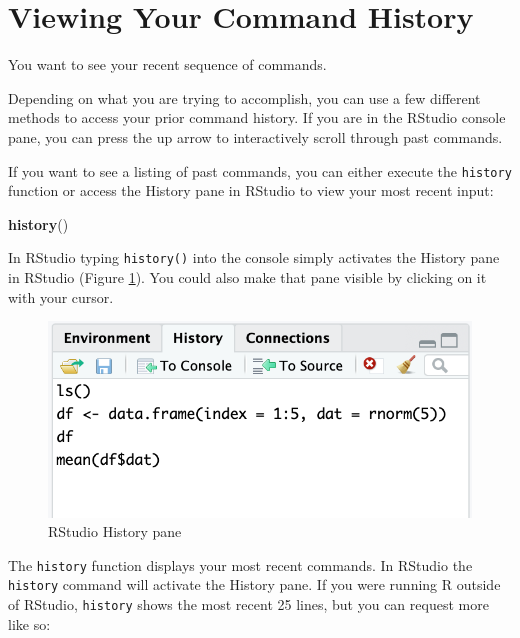 \documentclass[
]{book}
\newenvironment{Shaded}{\begin{snugshade}}{\end{snugshade}}
\newcommand{\KeywordTok}[1]{\textcolor[rgb]{0.13,0.29,0.53}{\textbf{#1}}}
\newcommand{\NormalTok}[1]{#1}
\begin{document}
\hypertarget{viewing-your-command-history}{%
\section{Viewing Your Command History}\label{viewing-your-command-history}}

You want to see your recent sequence of commands.

Depending on what you are trying to accomplish, you can use a few different methods to access your prior command history. If you are in the RStudio console pane, you can press the up arrow to interactively scroll through past commands.

If you want to see a listing of past commands, you can either execute the \texttt{history}
function or access the History pane in RStudio to view your most recent input:

\begin{Shaded}
\begin{Highlighting}[]
\KeywordTok{history}\NormalTok{()}
\end{Highlighting}
\end{Shaded}

In RStudio typing \texttt{history()} into the console simply activates the History pane in RStudio (Figure \ref{fig:history}). You could also make that pane visible by clicking on it with your cursor.

\begin{figure}
\includegraphics[width=9.78in]{images/history} \caption{RStudio History pane}\label{fig:history}
\end{figure}

The \texttt{history} function displays your most recent commands. In RStudio the \texttt{history} command will activate the History pane. If you were running R outside of RStudio, \texttt{history} shows the most recent 25 lines, but you can request more like so:
\end{document}
